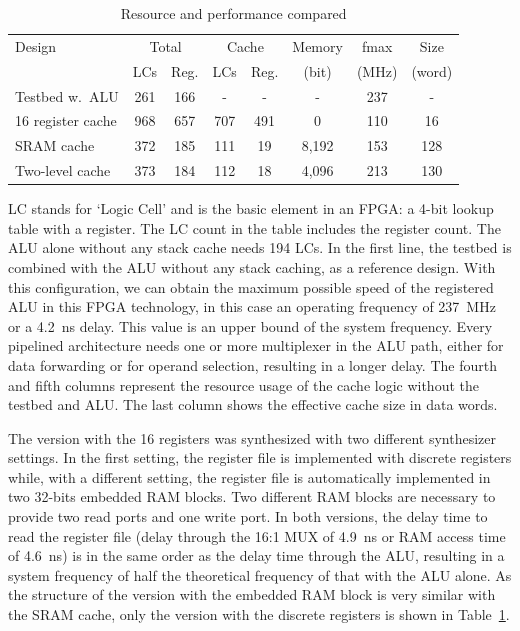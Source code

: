 \begin{table}
    \centering
    \begin{tabular}{lccccccc}
        \toprule
        Design& \multicolumn{2}{c}{Total}&
        \multicolumn{2}{c}{Cache}&
        Memory& fmax & Size\\
         & LCs& Reg.& LCs&
        Reg.& (bit)& (MHz) & (word)\\
        \midrule
        Testbed w.\ ALU& 261& 166& -& -& -&237 & - \\
        16 register cache& 968& 657& 707& 491& 0&110 & 16 \\
        SRAM cache& 372& 185& 111& 19& 8,192&153 & 128\\
        Two-level cache& 373& 184& 112& 18& 4,096& 213 & 130\\
        \bottomrule
    \end{tabular}
    \caption{Resource and performance compared}
    \label{tab_stack_resources}
\end{table}


LC stands for `Logic Cell' and is the basic element in an FPGA: a
4-bit lookup table with a register. The LC count in the table
includes the register count. The ALU alone without any stack cache
needs 194 LCs. In the first line, the testbed is combined with the
ALU without any stack caching, as a reference design. With this
configuration, we can obtain the maximum possible speed of the
registered ALU in this FPGA technology, in this case an operating
frequency of 237~MHz or a 4.2~ns delay. This value is an upper bound
of the system frequency. Every pipelined architecture needs one or
more multiplexer in the ALU path, either for data forwarding or for
operand selection, resulting in a longer delay. The fourth and fifth
columns represent the resource usage of the cache logic without the
testbed and ALU. The last column shows the effective cache size in
data words.

The version with the 16 registers was synthesized with two different
synthesizer settings. In the first setting, the register file is
implemented with discrete registers while, with a different setting,
the register file is automatically implemented in two 32-bits
embedded RAM blocks. Two different RAM blocks are necessary to
provide two read ports and one write port. In both versions, the
delay time to read the register file (delay through the 16:1 MUX of
4.9~ns or RAM access time of 4.6~ns) is in the same order as the
delay time through the ALU, resulting in a system frequency of half
the theoretical frequency of that with the ALU alone. As the
structure of the version with the embedded RAM block is very similar
with the SRAM cache, only the version with the discrete registers is
shown in Table~\ref{tab_stack_resources}.

